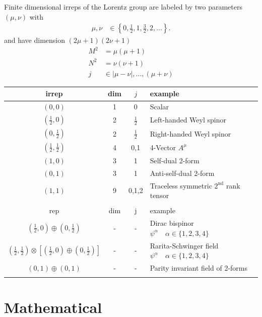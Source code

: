 \documentclass[10pt,a4paper]{article}
\theoremstyle{definition}
\begin{document}
Finite dimensional irreps of the Lorentz group are labeled by two parameters $(\mu,\nu)$ with
\begin{align}
    \mu,\nu &\in \left\{0,\frac{1}{2},1,\frac{3}{2},2,...\right\}.
\end{align}
and have dimension $(2\mu+1)(2\nu+1)$
\begin{align*}
    M^2&=\mu(\mu+1)\\
    N^2&=\nu(\nu+1)\\
    j  &\in |\mu-\nu|, ..., (\mu+\nu)
\end{align*}


\begin{center}
 \begin{tabular}{c c c l} 
 \hline
 irrep & dim & $j$ & example \\ [0.5ex] 
 \hline\hline
 $(0,0)$                        & 1 & 0 & Scalar \\  [0.5ex]
 $(\frac{1}{2},0)$              & 2 & $\frac{1}{2}$ & Left-handed Weyl spinor \\  [0.5ex]
 $(0,\frac{1}{2})$              & 2 & $\frac{1}{2}$ & Right-handed Weyl spinor \\  [0.5ex]
 $(\frac{1}{2},\frac{1}{2})$    & 4 & 0,1 & 4-Vector $A^\mu$ \\  [0.5ex]
 $(1,0)$                        & 3 & 1 & Self-dual 2-form \\  [0.5ex]
 $(0,1)$                        & 3 & 1 & Anti-self-dual 2-form \\  [0.5ex]
 $(1,1)$                        & 9 & 0,1,2 & Traceless symmetric $2^\text{nd}$ rank tensor \\ \hline  \\ [0.5ex]
  \hline
 rep & dim & j & example \\ [0.5ex] 
 \hline\hline
 $(\frac{1}{2},0)\oplus(0,\frac{1}{2})$& - & - & Dirac bispinor $\psi^\alpha\quad \alpha\in\{1,2,3,4\}$ \\  [0.5ex]
 $(\frac{1}{2},\frac{1}{2})\otimes\left[(\frac{1}{2},0)\oplus(0,\frac{1}{2})\right]$& - & - & Rarita-Schwinger field $\psi^\alpha\quad \alpha\in\{1,2,3,4\}$ \\  [0.5ex]
  $(0,1)\oplus(0,1)$& - & - & Parity invariant field of 2-forms\\ \hline \\ [0.5ex]
\end{tabular}
\end{center}



\newpage
\section{Mathematical}
\end{document}
